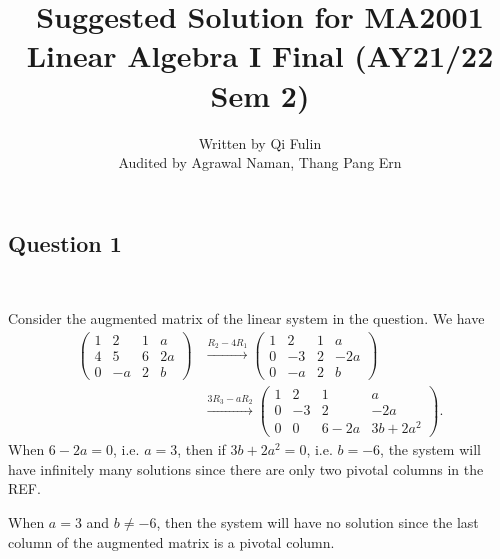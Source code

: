 \documentclass[12pt]{amsart}
\theoremstyle{plain}
\theoremstyle{definition}
\begin{document}
\title{Suggested Solution for MA2001 Linear Algebra I Final (AY21/22 Sem 2)}
\author{Written by Qi Fulin\\ Audited by Agrawal Naman, Thang Pang Ern}







\maketitle

\subsection*{Question 1} \ 

Consider the augmented matrix of the linear system in the question. We have
\begin{align*}
	\left(
	\begin{array}{ccc|c}
		1 & 2 & 1 & a\\
		4 & 5 & 6 & 2a\\
		0 & -a & 2 & b
	\end{array}
	\right)
	&\xrightarrow[]{R_2-4R_1}
	\left(
	\begin{array}{ccc|c}
		1 & 2 & 1 & a\\
		0 & -3 & 2 & -2a\\
		0 & -a & 2 & b
	\end{array}
	\right)\\
	&\xrightarrow[]{3R_3-aR_2}
	\left(
	\begin{array}{ccc|c}
		1 & 2 & 1 & a\\
		0 & -3 & 2 & -2a\\
		0 & 0 & 6-2a & 3b+2a^2
	\end{array}
	\right).
\end{align*}
When $6-2a=0$, i.e. $a=3$, then if $3b+2a^2=0$, i.e. $b=-6$, the system will have infinitely many solutions since there are only two pivotal columns in the REF.

\noindent When $a=3$ and $b\neq -6$, then the system will have no solution since the last column of the augmented matrix is a pivotal column. 
\end{document}
